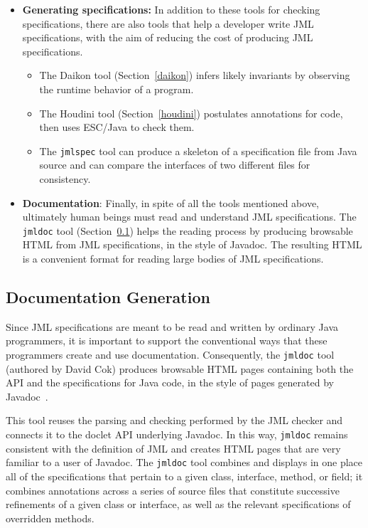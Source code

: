 \begin{itemize}
\item {\bf Generating specifications: } In addition to
  these tools for checking specifications, there are also tools that
  help a developer write JML specifications, with the aim of reducing
  the cost of producing JML specifications.
\begin{itemize}
\item The Daikon tool (Section~\ref{daikon})
  infers likely invariants by observing the runtime behavior
  of a program.
\item The Houdini tool (Section~\ref{houdini}) postulates annotations
  for code, then uses ESC/Java to check them.
\item The {\tt jmlspec} tool can produce a skeleton of a
  specification file from Java source and can compare the interfaces of
  two different files for consistency.
\end{itemize}

\item {\bf Documentation}: Finally, in spite of all the tools
  mentioned above, ultimately human beings must 
  read and understand JML specifications.  The {\tt jmldoc} tool
  (Section~\ref{jmldoc}) helps the reading process by producing
  browsable HTML from JML 
  specifications, in the style of Javadoc.  The resulting HTML is a
  convenient format for reading large bodies of JML specifications.

\end{itemize}

\subsection{Documentation Generation}
\label{jmldoc}


Since JML specifications are meant to be read and written by ordinary
Java programmers, it is important to support the conventional ways
that these programmers create and use documentation.  Consequently,
the {\tt jmldoc} tool (authored by David Cok)
produces browsable HTML pages containing both the
API and the specifications for Java code, in the style of pages
generated by Javadoc~\cite{Friendly95}.

This tool reuses the parsing and checking performed by the JML checker
and connects it to the doclet API underlying Javadoc.  In this way,
\texttt{jmldoc} remains consistent with the definition of JML and
creates HTML pages that are very familiar to a user of Javadoc.  The
{\tt jmldoc} tool combines and displays in one place all of the
specifications that pertain to a given class, interface, method, or
field; it combines annotations across a series of source files that
constitute successive refinements of a given class or interface, as
well as the relevant specifications of overridden methods.

